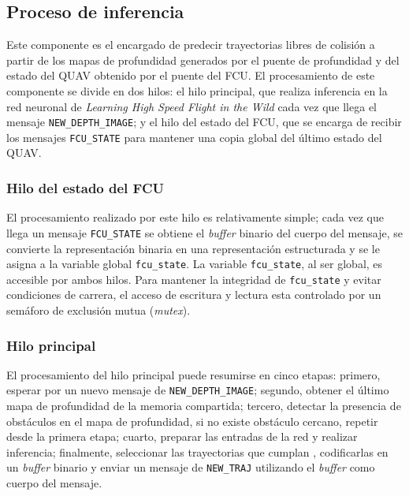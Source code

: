 \subsection{Proceso de inferencia}

Este componente es el encargado de predecir trayectorias libres de colisión a partir de los mapas de profundidad generados por el puente de profundidad y del estado del QUAV obtenido por el puente del FCU. El procesamiento de este componente se divide en dos hilos: el hilo principal, que realiza inferencia en la red neuronal de \textit{Learning High Speed Flight in the Wild} \cite{Loquercio2021} cada vez que llega el mensaje \texttt{NEW\_DEPTH\_IMAGE}; y el hilo del estado del FCU, que se encarga de recibir los mensajes \texttt{FCU\_STATE} para mantener una copia global del último estado del QUAV.

\subsubsection*{Hilo del estado del FCU}

El procesamiento realizado por este hilo es relativamente simple; cada vez que llega un mensaje \texttt{FCU\_STATE} se obtiene el \textit{buffer} binario del cuerpo del mensaje, se convierte la representación binaria en una representación estructurada y se le asigna a la variable global \texttt{fcu\_state}. La variable \texttt{fcu\_state}, al ser global, es accesible por ambos hilos. Para mantener la integridad de \texttt{fcu\_state} y evitar condiciones de carrera, el acceso de escritura y lectura esta controlado por un semáforo de exclusión mutua (\textit{mutex}).

\subsubsection*{Hilo principal}

El procesamiento del hilo principal puede resumirse en cinco etapas: primero, esperar por un nuevo mensaje de \texttt{NEW\_DEPTH\_IMAGE}; segundo, obtener el último mapa de profundidad de la memoria compartida; tercero, detectar la presencia de obstáculos en el mapa de profundidad, si no existe obstáculo cercano, repetir desde la primera etapa; cuarto, preparar las entradas de la red y realizar inferencia; finalmente, seleccionar las trayectorias que cumplan , codificarlas en un \textit{buffer} binario y enviar un mensaje de \texttt{NEW\_TRAJ} utilizando el \textit{buffer} como cuerpo del mensaje.

